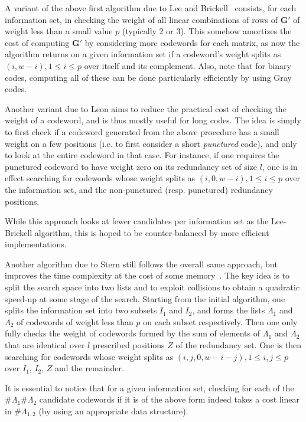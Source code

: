 \documentclass[11pt,a4paper]{article}
\theoremstyle{definition}
\begin{document}
\smallskip

A variant of the above first algorithm due to Lee and Brickell~\cite{LeeBrickell} consists, for each information set, in checking the weight of all linear combinations of rows of $\bm{G}'$ of weight less than a small value $p$ (typically 2 or 3). This somehow amortizes
the cost of computing $\bm{G}'$ by considering more codewords for each matrix, as now the algorithm returns on a given information set if
a codeword's weight splits as $(i,w-i), 1 \leq i \leq p$ over itself and its complement.
Also, note that for binary codes, computing all of these can be done particularly efficiently by using Gray codes.

\smallskip

Another variant due to Leon aims to reduce the practical cost of checking the weight of a codeword, and is thus mostly useful for long codes. The idea is simply to first check
if a codeword generated from the above procedure has a small weight on a few positions (i.e. to first consider a short \emph{punctured} code), and only to look at the entire
codeword in that case. For instance, if one requires the punctured codeword to have weight zero on its redundancy set of size $l$, one is in effect searching for codewords
whose weight splits as $(i,0,w-i), 1 \leq i \leq p$ over the information set, and the non-punctured (resp. punctured) redundancy positions.

While this approach looks at fewer candidates per information set as the Lee-Brickell algorithm, this is hoped to be counter-balanced by more efficient implementations.

\medskip

Another algorithm due to Stern still follows the overall same approach, but improves the time complexity at the cost of some memory~\cite{Stern}. The key idea is to split the search
space into two lists and to exploit collisions to obtain a quadratic speed-up at some stage of the search. Starting from the initial algorithm, one splits the information set
into two subsets $I_1$ and $I_2$, and forms the lists $\Lambda_1$ and $\Lambda_2$ of codewords of weight less than $p$ on each subset respectively. Then one only fully checks the weight of
codewords formed by the sum of elements of $\Lambda_1$ and $\Lambda_2$ that are identical over $l$ prescribed positions $Z$ of the redundancy set. One is then searching for codewords
whose weight splits as $(i,j,0,w-i-j), 1 \leq i,j \leq p$ over $I_1$, $I_2$, $Z$ and the remainder.

It is essential to notice that for a given information set, checking for each of the $\#\Lambda_1\#\Lambda_2$ candidate codewords if it is of the above form indeed takes a cost
linear in $\#\Lambda_{1,2}$ (by using an appropriate data structure).
\end{document}

